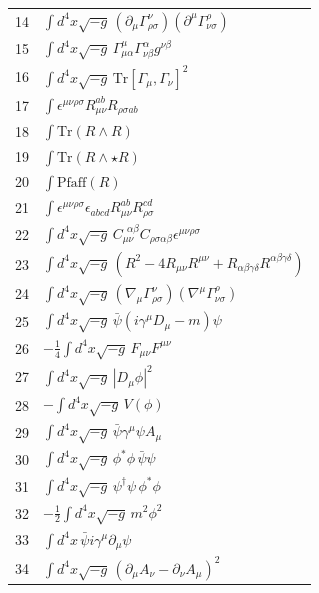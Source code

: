\documentclass[11pt,a4paper]{article}
\begin{document}
\begin{longtable}{r p{}}
	14 & \(\displaystyle \int d^4x\sqrt{-g}\,(\partial_\mu\Gamma^{\nu}_{\rho\sigma})(\partial^\mu\Gamma^{\rho}_{\nu\sigma})\) \\
	15 & \(\displaystyle \int d^4x\sqrt{-g}\,\Gamma^{\mu}_{\mu\alpha}\Gamma^{\alpha}_{\nu\beta}g^{\nu\beta}\) \\
	16 & \(\displaystyle \int d^4x\sqrt{-g}\,\mathrm{Tr}[\Gamma_\mu,\Gamma_\nu]^2\) \\
	17 & \(\displaystyle \int \epsilon^{\mu\nu\rho\sigma}R_{\mu\nu}^{ab}R_{\rho\sigma ab}\) \\
	18 & \(\displaystyle \int \mathrm{Tr}(R\wedge R)\) \\
	19 & \(\displaystyle \int \mathrm{Tr}(R\wedge\star R)\) \\
	20 & \(\displaystyle \int \mathrm{Pfaff}(R)\) \\
	21 & \(\displaystyle \int \epsilon^{\mu\nu\rho\sigma}\epsilon_{abcd}R_{\mu\nu}^{ab}R_{\rho\sigma}^{cd}\) \\
	22 & \(\displaystyle \int d^4x\sqrt{-g}\,C_{\mu\nu}^{\ \ \alpha\beta}C_{\rho\sigma\alpha\beta}\epsilon^{\mu\nu\rho\sigma}\) \\
	23 & \(\displaystyle \int d^4x\sqrt{-g}\,(R^2 - 4R_{\mu\nu}R^{\mu\nu} + R_{\alpha\beta\gamma\delta}R^{\alpha\beta\gamma\delta})\) \\
	24 & \(\displaystyle \int d^4x\sqrt{-g}\,(\nabla_\mu\Gamma^{\nu}_{\rho\sigma})(\nabla^\mu\Gamma^{\rho}_{\nu\sigma})\) \\
	25 & \(\displaystyle \int d^4x\sqrt{-g}\,\bar\psi(i\gamma^\mu D_\mu - m)\psi\) \\
	26 & \(\displaystyle -\frac14\int d^4x\sqrt{-g}\,F_{\mu\nu}F^{\mu\nu}\) \\
	27 & \(\displaystyle \int d^4x\sqrt{-g}\,|D_\mu\phi|^2\) \\
	28 & \(\displaystyle -\int d^4x\sqrt{-g}\,V(\phi)\) \\
	29 & \(\displaystyle \int d^4x\sqrt{-g}\,\bar\psi\gamma^\mu\psi A_\mu\) \\
	30 & \(\displaystyle \int d^4x\sqrt{-g}\,\phi^*\phi\,\bar\psi\psi\) \\
	31 & \(\displaystyle \int d^4x\sqrt{-g}\,\psi^\dagger\psi\,\phi^*\phi\) \\
	32 & \(\displaystyle -\frac12\int d^4x\sqrt{-g}\,m^2\phi^2\) \\
	33 & \(\displaystyle \int d^4x\,\bar\psi i\gamma^\mu\partial_\mu\psi\) \\
	34 & \(\displaystyle \int d^4x\sqrt{-g}\,(\partial_\mu A_\nu - \partial_\nu A_\mu)^2\) \\

\end{longtable}
\end{document}
